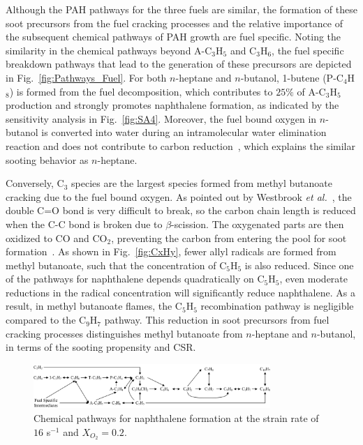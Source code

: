 \documentclass[review,3p,times]{elsarticleUS}
\begin{document}
Although the PAH pathways for the three fuels are similar, the formation of these soot precursors from the fuel cracking processes and the relative importance of the subsequent chemical pathways of PAH growth are fuel specific. Noting the similarity in the chemical pathways beyond A-C$_3$H$_5$ and C$_3$H$_6$, the fuel specific breakdown pathways that lead to the generation of these precursors are depicted in Fig.~\ref{fig:Pathways_Fuel}. For both $n$-heptane and $n$-butanol, 1-butene (P-C$_4$H$_8$) is formed from the fuel decomposition, which contributes to $25\%$ of A-C$_3$H$_5$ production and strongly promotes naphthalene formation, as indicated by the sensitivity analysis in Fig.~\ref{fig:SA4}. Moreover, the fuel bound oxygen in $n$-butanol is converted into water during an intramolecular water elimination reaction and does not contribute to carbon reduction~\cite{mcenally05,mcenally11}, which explains the similar sooting behavior as $n$-heptane.

Conversely, C$_3$ species are the largest species formed from methyl butanoate cracking due to the fuel bound oxygen. As pointed out by Westbrook \emph{et al.}~\cite{westbrook06}, the double C=O bond is very difficult to break, so the carbon chain length is reduced when the C-C bond is broken due to $\beta$-scission. The oxygenated parts are then oxidized to CO and CO$_2$, preventing the carbon from entering the pool for soot formation~\cite{feng12,wangyl11}. As shown in Fig.~\ref{fig:CxHy}, fewer allyl radicals are formed from methyl butanoate, such that the concentration of C$_5$H$_5$ is also reduced. Since one of the pathways for naphthalene depends quadratically on C$_5$H$_5$, even moderate reductions in the radical concentration will significantly reduce naphthalene. As a result, in methyl butanoate flames, the C$_5$H$_5$ recombination pathway is negligible compared to the C$_9$H$_7$ pathway. This reduction in soot precursors from fuel cracking processes distinguishes methyl butanoate from $n$-heptane 
and $n$-butanol, in terms of the sooting propensity and CSR.

\begin{figure}[ht]
  \centering
  \scriptsize
  \includegraphics[width=0.8\textwidth]{Pathways-PAH.png}
  \normalsize
  \caption{Chemical pathways for naphthalene formation at the strain rate of $16$ s$^{-1}$ and $X_{O_2}=0.2$.}
  \label{fig:Pathways_PAH}
\end{figure}
\end{document}
